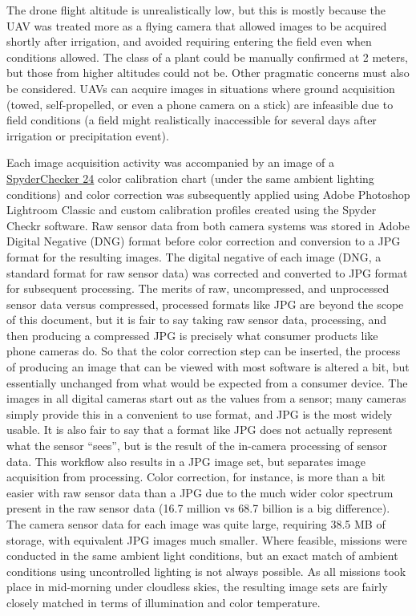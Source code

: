 \documentclass[letterpaper]{report}
\begin{document}
The drone flight altitude is unrealistically low, but this is mostly because the UAV was treated more as a flying camera that allowed images to be acquired shortly after irrigation, and avoided requiring entering the field even when conditions allowed. The class of a plant could be manually confirmed at 2 meters, but those from higher altitudes could not be. Other pragmatic concerns must also be considered. UAVs can acquire images in situations where ground acquisition (towed, self-propelled, or even a phone camera on a stick) are infeasible due to field conditions (a field might realistically inaccessible for several days after irrigation or precipitation event).


Each image acquisition activity was accompanied by an image of a \href{https://www.datacolor.com/spyder/products/spyder-checkr-photo/} {SpyderChecker 24} color calibration chart (under the same ambient lighting conditions) and color correction was subsequently applied using Adobe Photoshop Lightroom Classic and custom calibration profiles created using the Spyder Checkr software. Raw sensor data from both camera systems was stored in Adobe Digital Negative (DNG) format before color correction and conversion to a JPG format for the resulting images. The digital negative of each image (DNG, a standard format for raw sensor data) was corrected and converted to JPG format for subsequent processing. The merits of raw, uncompressed, and unprocessed sensor data versus compressed, processed formats like JPG are beyond the scope of this document, but it is fair to say taking raw sensor data, processing, and then producing a compressed JPG is precisely what consumer products like phone cameras do. So that the color correction step can be inserted, the process of producing an image that can be viewed with most software is altered a bit, but essentially unchanged from what would be expected from a consumer device. The images in all digital cameras start out as the values from a sensor; many cameras simply provide this in a convenient to use format, and JPG is the most widely usable. It is also fair to say that a format like JPG does not actually represent what the sensor ``sees'', but is the result of the in-camera processing of sensor data. This workflow also results in a JPG image set, but separates image acquisition from processing. Color correction, for instance, is more than a bit easier with raw sensor data than a JPG due to  the much wider color spectrum present in the raw sensor data (16.7 million vs 68.7 billion is a big difference). The camera sensor data for each image was quite large, requiring 38.5 MB of storage, with equivalent JPG images much smaller.
Where feasible, missions were conducted in the same ambient light conditions, but an exact match of ambient conditions using uncontrolled lighting is not always possible. As all missions took place in mid-morning under cloudless skies, the resulting image sets are fairly closely matched in terms of illumination and color temperature.
\end{document}
